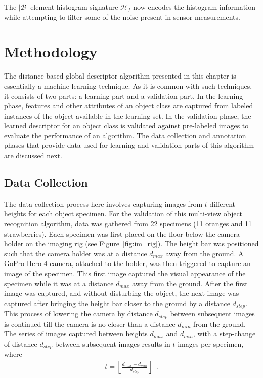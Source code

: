 The $|\mathcal{B}|$-element histogram signature $\mathcal{H}_f$ now encodes the histogram information while attempting to filter some of the noise present in sensor measurements.

\section{Methodology}
\label{sec:distdes_methodology}


The distance-based global descriptor algorithm presented in this chapter is essentially a machine learning technique. As it is common with such techniques, it consists of two parts: a learning part and a validation part. In the learning phase, features and other attributes of an object class are captured from labeled instances of the object available in the learning set. In the validation phase, the learned descriptor for an object class is validated against pre-labeled images to evaluate the performance of an algorithm. The data collection and annotation phases that provide data used for learning and validation parts of this algorithm are discussed next.

\subsection{Data Collection}
\label{sec:distdes_data_collection}



The data collection process here involves capturing images from $t$ different heights for each object specimen. For the validation of this multi-view object recognition algorithm, data was gathered from 22 specimens (11 oranges and 11 strawberries). Each specimen was first placed on the floor below the camera-holder on the imaging rig (see Figure~\ref{fig:im_rig}). The height bar was positioned such that the camera holder was at a distance $d_{max}$ away from the ground. A GoPro Hero 4 camera, attached to the holder, was then triggered to capture an image of the specimen. This first image captured the visual appearance of the specimen while it was at a distance $d_{max}$ away from the ground. After the first image was captured, and without disturbing the object, the next image was captured after bringing the height bar closer to the ground by a distance $d_{step}$.
This process of lowering the camera by distance $d_{step}$ between subsequent images is continued till the camera is no closer than a distance $d_{min}$ from the ground. 
The series of images captured between heights $d_{max}$ and $d_{min}$, with a step-change of distance $d_{step}$ between subsequent images results in $t$ images per specimen, where
\begin{align}
 t=\left\lfloor\frac{d_{max}-d_{min}}{d_{step}}\right\rfloor \enspace. 
\end{align}

